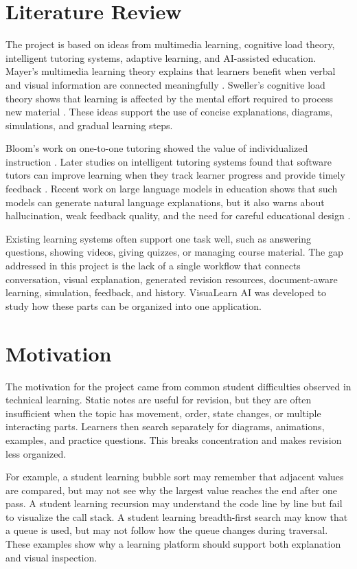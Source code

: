 \section[Literature Review]{\textbf{Literature Review}}

The project is based on ideas from multimedia learning, cognitive load theory, intelligent tutoring systems, adaptive learning, and AI-assisted education. Mayer's multimedia learning theory explains that learners benefit when verbal and visual information are connected meaningfully \cite{Mayer2009}. Sweller's cognitive load theory shows that learning is affected by the mental effort required to process new material \cite{Sweller1988}. These ideas support the use of concise explanations, diagrams, simulations, and gradual learning steps.

Bloom's work on one-to-one tutoring showed the value of individualized instruction \cite{Bloom1984}. Later studies on intelligent tutoring systems found that software tutors can improve learning when they track learner progress and provide timely feedback \cite{VanLehn2011,Ma2014}. Recent work on large language models in education shows that such models can generate natural language explanations, but it also warns about hallucination, weak feedback quality, and the need for careful educational design \cite{Kasneci2023}.

Existing learning systems often support one task well, such as answering questions, showing videos, giving quizzes, or managing course material. The gap addressed in this project is the lack of a single workflow that connects conversation, visual explanation, generated revision resources, document-aware learning, simulation, feedback, and history. VisuaLearn AI was developed to study how these parts can be organized into one application.

\section[Motivation]{\textbf{Motivation}}

The motivation for the project came from common student difficulties observed in technical learning. Static notes are useful for revision, but they are often insufficient when the topic has movement, order, state changes, or multiple interacting parts. Learners then search separately for diagrams, animations, examples, and practice questions. This breaks concentration and makes revision less organized.

For example, a student learning bubble sort may remember that adjacent values are compared, but may not see why the largest value reaches the end after one pass. A student learning recursion may understand the code line by line but fail to visualize the call stack. A student learning breadth-first search may know that a queue is used, but may not follow how the queue changes during traversal. These examples show why a learning platform should support both explanation and visual inspection.

